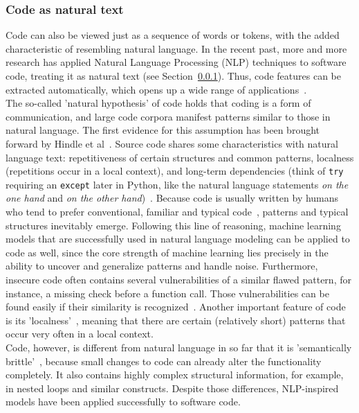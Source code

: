 \documentclass[
a4paper,
pagesize,
pdftex,
12pt,
ngerman,
fleqn,
final,
]{scrartcl}
\begin{document}
	\subsubsection{Code as natural text}\label{Natural-Hypothesis}\label{Semantically-Brittle}
	Code can also be viewed just as a sequence of words or tokens, with the added characteristic of resembling natural language. In the recent past, more and more research has applied Natural Language Processing (NLP) techniques to software code, treating it as natural text (see Section~\ref{Natural-Hypothesis}). Thus, code features can be extracted automatically, which opens up a wide range of applications~\cite{Dam.2017}.\\
	The so-called 'natural hypothesis' of code holds that coding is a form of communication, and large code corpora manifest patterns similar to those in natural language. The first evidence for this assumption has been brought forward by Hindle et al~\cite{Hindle.2012}.
	Source code shares some characteristics with natural language text: repetitiveness of certain structures and common patterns, localness (repetitions occur in a local context), and long-term dependencies (think of \texttt{try} requiring an \texttt{except} later in Python, like the natural language statements \textit{on the one hand} and \textit{on the other hand})~\cite{Dam.2016}.
	Because code is usually written by humans who tend to prefer conventional, familiar and typical code~\cite{Allamanis.2018}, patterns and typical structures inevitably emerge. Following this line of reasoning, machine learning models that are successfully used in natural language modeling can be applied to code as well, since the core strength of machine learning lies precisely in the ability to uncover and generalize patterns and handle noise. Furthermore, insecure code often contains several vulnerabilities of a similar flawed pattern, for instance, a missing check before a function call. Those vulnerabilities can be found easily if their similarity is recognized~\cite{Yamaguchi.2012}. 
	Another important feature of code is its 'localness'~\cite{Tu.2014}, meaning that there are certain (relatively short) patterns that occur very often in a local context.\\ 
	Code, however, is different from natural language in so far that it is 'semantically brittle'~\cite{Allamanis.2018}, because small changes to code can already alter the functionality completely. It also contains highly complex structural information, for example, in nested loops and similar constructs. Despite those differences, NLP-inspired models have been applied successfully to software code.
	
\end{document}
